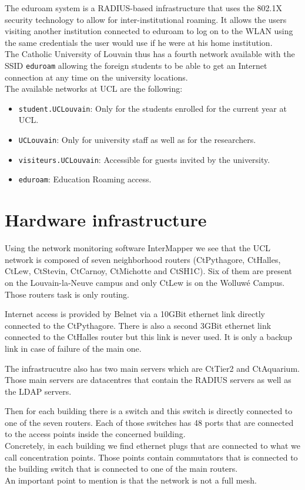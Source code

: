 The eduroam system is a RADIUS-based infrastructure that uses the 802.1X security technology to allow for inter-institutional roaming. It allows the users visiting another institution connected to eduroam to log on to the WLAN using the same credentials the user would use if he were at his home institution\cite{eduroam2}.\\
The Catholic University of Louvain thus has a fourth network available with the SSID \texttt{eduroam} allowing the foreign students to be able to get an Internet connection at any time on the university locations.\\
The available networks at UCL are the following:
\begin{itemize}
	\item \texttt{student.UCLouvain}: Only for the students enrolled for the current year at UCL.
	\item \texttt{UCLouvain}: Only for university staff as well as for the researchers.
	\item \texttt{visiteurs.UCLouvain}: Accessible for guests invited by the university.
	\item \texttt{eduroam}: Education Roaming access.
\end{itemize}



\section{Hardware infrastructure}
Using the network monitoring software InterMapper\cite{intermapper} we see that the UCL network is composed of seven neighborhood routers (CtPythagore, CtHalles, CtLew, CtStevin, CtCarnoy, CtMichotte and CtSH1C). Six of them are present on the Louvain-la-Neuve campus and only CtLew is on the Wolluwé Campus. Those routers task is only routing.

Internet access is provided by Belnet via a 10GBit ethernet link directly connected to the CtPythagore. There is also a second 3GBit ethernet link connected to the CtHalles router but this link is never used. It is only a backup link in case of failure of the main one.

The infrastrucutre also has two main servers which are CtTier2 and CtAquarium. Those main servers are datacentres that contain the RADIUS servers as well as the LDAP servers.

Then for each building there is a switch and this switch is directly connected to one of the seven routers. Each of those switches has 48 ports that are connected to the access points inside the concerned building.\\
Concretely, in each building we find ethernet plugs that are connected to what we call concentration points. Those points contain commutators that is connected to the building switch that is connected to one of the main routers.\\
An important point to mention is that the network is not a full mesh.

